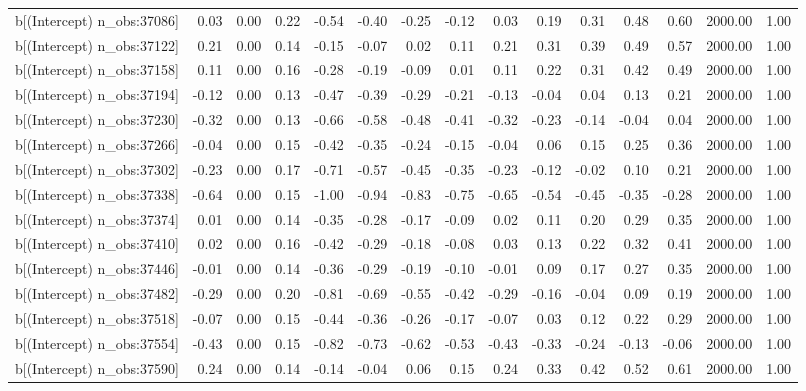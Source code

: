 \begin{table}[ht]
\begin{tabular}{rrrrrrrrrrrrrrr}
  b[(Intercept) n\_obs:37086] & 0.03 & 0.00 & 0.22 & -0.54 & -0.40 & -0.25 & -0.12 & 0.03 & 0.19 & 0.31 & 0.48 & 0.60 & 2000.00 & 1.00 \\ 
  b[(Intercept) n\_obs:37122] & 0.21 & 0.00 & 0.14 & -0.15 & -0.07 & 0.02 & 0.11 & 0.21 & 0.31 & 0.39 & 0.49 & 0.57 & 2000.00 & 1.00 \\ 
  b[(Intercept) n\_obs:37158] & 0.11 & 0.00 & 0.16 & -0.28 & -0.19 & -0.09 & 0.01 & 0.11 & 0.22 & 0.31 & 0.42 & 0.49 & 2000.00 & 1.00 \\ 
  b[(Intercept) n\_obs:37194] & -0.12 & 0.00 & 0.13 & -0.47 & -0.39 & -0.29 & -0.21 & -0.13 & -0.04 & 0.04 & 0.13 & 0.21 & 2000.00 & 1.00 \\ 
  b[(Intercept) n\_obs:37230] & -0.32 & 0.00 & 0.13 & -0.66 & -0.58 & -0.48 & -0.41 & -0.32 & -0.23 & -0.14 & -0.04 & 0.04 & 2000.00 & 1.00 \\ 
  b[(Intercept) n\_obs:37266] & -0.04 & 0.00 & 0.15 & -0.42 & -0.35 & -0.24 & -0.15 & -0.04 & 0.06 & 0.15 & 0.25 & 0.36 & 2000.00 & 1.00 \\ 
  b[(Intercept) n\_obs:37302] & -0.23 & 0.00 & 0.17 & -0.71 & -0.57 & -0.45 & -0.35 & -0.23 & -0.12 & -0.02 & 0.10 & 0.21 & 2000.00 & 1.00 \\ 
  b[(Intercept) n\_obs:37338] & -0.64 & 0.00 & 0.15 & -1.00 & -0.94 & -0.83 & -0.75 & -0.65 & -0.54 & -0.45 & -0.35 & -0.28 & 2000.00 & 1.00 \\ 
  b[(Intercept) n\_obs:37374] & 0.01 & 0.00 & 0.14 & -0.35 & -0.28 & -0.17 & -0.09 & 0.02 & 0.11 & 0.20 & 0.29 & 0.35 & 2000.00 & 1.00 \\ 
  b[(Intercept) n\_obs:37410] & 0.02 & 0.00 & 0.16 & -0.42 & -0.29 & -0.18 & -0.08 & 0.03 & 0.13 & 0.22 & 0.32 & 0.41 & 2000.00 & 1.00 \\ 
  b[(Intercept) n\_obs:37446] & -0.01 & 0.00 & 0.14 & -0.36 & -0.29 & -0.19 & -0.10 & -0.01 & 0.09 & 0.17 & 0.27 & 0.35 & 2000.00 & 1.00 \\ 
  b[(Intercept) n\_obs:37482] & -0.29 & 0.00 & 0.20 & -0.81 & -0.69 & -0.55 & -0.42 & -0.29 & -0.16 & -0.04 & 0.09 & 0.19 & 2000.00 & 1.00 \\ 
  b[(Intercept) n\_obs:37518] & -0.07 & 0.00 & 0.15 & -0.44 & -0.36 & -0.26 & -0.17 & -0.07 & 0.03 & 0.12 & 0.22 & 0.29 & 2000.00 & 1.00 \\ 
  b[(Intercept) n\_obs:37554] & -0.43 & 0.00 & 0.15 & -0.82 & -0.73 & -0.62 & -0.53 & -0.43 & -0.33 & -0.24 & -0.13 & -0.06 & 2000.00 & 1.00 \\ 
  b[(Intercept) n\_obs:37590] & 0.24 & 0.00 & 0.14 & -0.14 & -0.04 & 0.06 & 0.15 & 0.24 & 0.33 & 0.42 & 0.52 & 0.61 & 2000.00 & 1.00 \\ 

\end{tabular}
\end{table}
